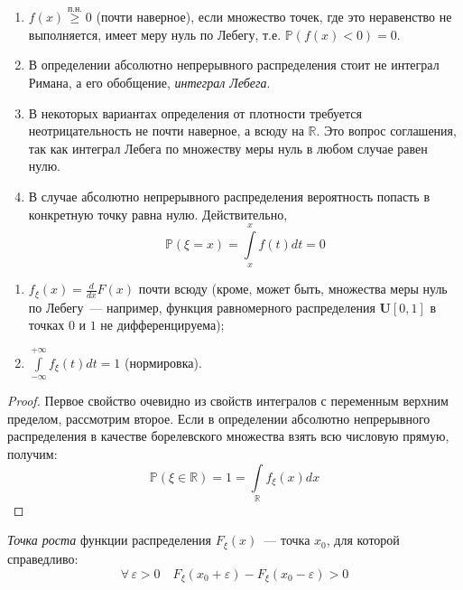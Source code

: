 \begin{rmrk}
\begin{enumerate}\leavevmode
    \item 
        $f(x) \overset{\text{п.н.}}{\geqslant} 0$ (почти наверное), если множество точек, где это неравенство не выполняется, имеет меру нуль по Лебегу, т.е. $\mathbb{P}(f(x) < 0) = 0$.
    \item 
        В определении абсолютно непрерывного распределения стоит не интеграл Римана, а его обобщение, \textit{интеграл Лебега}.
    \item 
        В некоторых вариантах определения от плотности требуется неотрицательность не почти наверное, а всюду на $\mathbb{R}$. 
        Это вопрос соглашения, так как интеграл Лебега по множеству меры нуль в любом случае равен нулю.
    \item 
        В случае абсолютно непрерывного распределения вероятность попасть в конкретную точку равна нулю. Действительно,
        \begin{equation*}
            \mathbb{P}(\xi = x) = \int\limits_{x}^{x} f(t)dt = 0
        \end{equation*}
\end{enumerate}
\end{rmrk}

\begin{namedthm}\leavevmode
\begin{enumerate}
    \item $f_{\xi}(x) = \frac{d}{dx}F(x)$ почти всюду (кроме, может быть, множества меры нуль по Лебегу~--- например, функция равномерного распределения $\mathbf{U}[0, 1]$ в точках $0$ и $1$ не дифференцируема);
    \item $\int\limits_{-\infty}^{+\infty} f_\xi(t) dt = 1$ (нормировка).
\end{enumerate}
\end{namedthm}
\begin{proof}
    Первое свойство очевидно из свойств интегралов с переменным верхним пределом, рассмотрим второе. 
    Если в определении абсолютно непрерывного распределения в качестве борелевского множества взять всю числовую прямую, получим: 
    \begin{equation*}
        \mathbb{P}(\xi \in \mathbb{R})=1=\int\limits_{\mathbb{R}} f_{\xi}(x) dx
    \end{equation*}
\end{proof}

\begin{defn}
    \textit{Точка роста} функции распределения $F_\xi(x)$~--- точка $x_0$, для которой справедливо:
\begin{equation*}
    \forall \, \varepsilon > 0 \quad F_\xi(x_0 + \varepsilon) - F_\xi(x_0 - \varepsilon) > 0
\end{equation*}
\end{defn}

